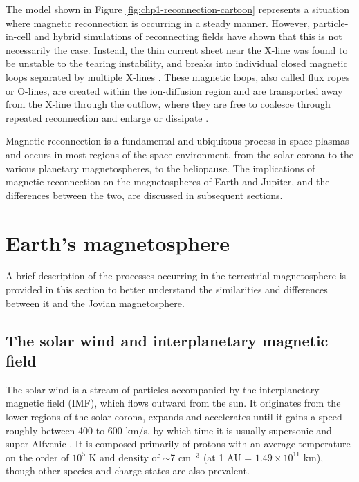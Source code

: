 The model shown in Figure \ref{fig:chp1-reconnection-cartoon} represents a situation where magnetic reconnection is occurring in a steady manner. However, particle-in-cell and hybrid simulations of reconnecting fields have shown that this is not necessarily the case. Instead, the thin current sheet near the X-line was found to be unstable to the tearing instability, and breaks into individual closed magnetic loops separated by multiple X-lines \cite{Drake2006ElectronReconnection,Drake2006FormationReconnection}. These magnetic loops, also called flux ropes or O-lines, are created within the ion-diffusion region and are transported away from the X-line through the outflow, where they are free to coalesce through repeated reconnection and enlarge or dissipate \cite{Markidis2012CollisionlessChain,Wang2016CoalescenceReconnection}. 

Magnetic reconnection is a fundamental and ubiquitous process in space plasmas and occurs in most regions of the space environment, from the solar corona to the various planetary magnetospheres, to the heliopause. The implications of magnetic reconnection on the magnetospheres of Earth and Jupiter, and the differences between the two, are discussed in subsequent sections.


\section{Earth's magnetosphere}
A brief description of the processes occurring in the terrestrial magnetosphere is provided in this section to better understand the similarities and differences between it and the Jovian magnetosphere.

\subsection{The solar wind and interplanetary magnetic field}
The solar wind is a stream of particles accompanied by the interplanetary magnetic field (IMF), which flows outward from the sun. It originates from the lower regions of the solar corona, expands and accelerates until it gains a speed roughly between 400 to 600 km/s, by which time it is usually supersonic and super-Alfvenic \cite{Gombosi1998PhysicsEnvironment}. It is composed primarily of protons with an average temperature on the order of $10^5$ K and density of $\sim$7 cm$^{-3}$ (at 1 AU = $1.49 \times 10^{11}$ km), though other species and charge states are also prevalent.

